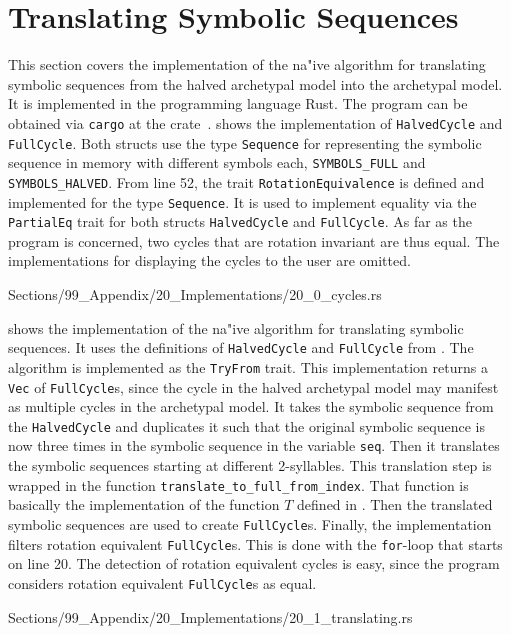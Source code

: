 \section{Translating Symbolic Sequences}

This section covers the implementation of the na"ive algorithm for translating symbolic sequences from the halved archetypal model into the archetypal model.
It is implemented in the programming language Rust.
The program can be obtained via \texttt{cargo} at the crate~\cite{TranslatingSymbolicCrate}.
 shows the implementation of \texttt{HalvedCycle} and \texttt{FullCycle}.
Both structs use the type \texttt{Sequence} for representing the symbolic sequence in memory with different symbols each, \texttt{SYMBOLS\_FULL} and \texttt{SYMBOLS\_HALVED}.
From line 52, the trait \texttt{RotationEquivalence} is defined and implemented for the type \texttt{Sequence}.
It is used to implement equality via the \texttt{PartialEq} trait for both structs \texttt{HalvedCycle} and \texttt{FullCycle}.
As far as the program is concerned, two cycles that are rotation invariant are thus equal.
The implementations for displaying the cycles to the user are omitted.


{Sections/99_Appendix/20_Implementations/20_0_cycles.rs}

\clearpage
{} shows the implementation of the na"ive algorithm for translating symbolic sequences.
It uses the definitions of \texttt{HalvedCycle} and \texttt{FullCycle} from .
The algorithm is implemented as the \texttt{TryFrom} trait.
This implementation returns a \texttt{Vec} of \texttt{FullCycle}s, since the cycle in the halved archetypal model may manifest as multiple cycles in the archetypal model.
It takes the symbolic sequence from the \texttt{HalvedCycle} and duplicates it such that the original symbolic sequence is now three times in the symbolic sequence in the variable \texttt{seq}.
Then it translates the symbolic sequences starting at different 2-syllables.
This translation step is wrapped in the function \texttt{translate\_to\_full\_from\_index}.
That function is basically the implementation of the function $T$ defined in .
Then the translated symbolic sequences are used to create \texttt{FullCycle}s.
Finally, the implementation filters rotation equivalent \texttt{FullCycle}s.
This is done with the \texttt{for}-loop that starts on line 20.
The detection of rotation equivalent cycles is easy, since the program considers rotation equivalent \texttt{FullCycle}s as equal.



{Sections/99_Appendix/20_Implementations/20_1_translating.rs}
